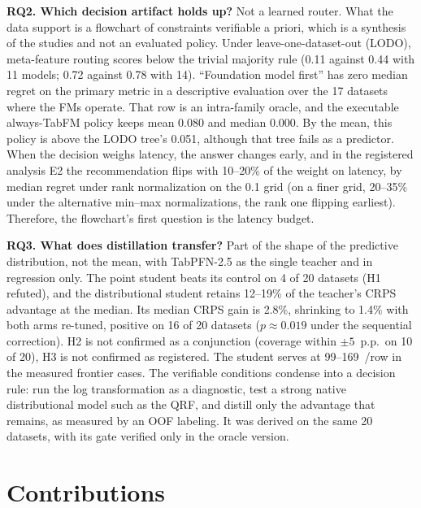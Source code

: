 \textbf{RQ2. Which decision artifact holds up?} Not a learned router. What the data support is a flowchart of constraints verifiable a priori, which is a synthesis of the studies and not an evaluated policy. Under
leave-one-dataset-out (LODO), meta-feature routing scores below the
trivial majority rule (0.11 against 0.44 with 11 models; 0.72 against
0.78 with 14). ``Foundation model first'' has zero median regret on
the primary metric in a descriptive evaluation over the 17 datasets
where the FMs operate. That row is an intra-family oracle,
and the executable always-TabFM policy keeps mean 0.080 and
median 0.000. By the mean, this policy is above the LODO tree's 0.051,
although that tree fails as a predictor. When the decision weighs
latency, the answer changes early, and in the registered analysis E2
the recommendation flips with 10--20\% of the weight on latency, by median regret under rank normalization on the 0.1 grid (on a finer grid, 20--35\% under the alternative min--max normalizations, the rank one flipping earliest).
Therefore, the flowchart's first question is the
latency budget.

\textbf{RQ3. What does distillation transfer?} Part of the
shape of the predictive distribution, not the mean, with TabPFN-2.5
as the single teacher and in regression only. The point student beats its control on 4 of 20 datasets (H1
refuted), and the distributional student retains 12--19\% of the
teacher's CRPS advantage at the median. Its median CRPS gain is
2.8\%, shrinking to 1.4\% with both arms re-tuned, positive on 16 of
20 datasets ($p\approx0.019$ under the sequential correction). H2 is not confirmed as a conjunction (coverage within
$\pm5$~p.p.\ on 10 of 20), H3 is not confirmed as registered. The student serves at 99--169~\us/row in the measured frontier cases. The
verifiable conditions condense into a decision rule: run the log
transformation as a diagnostic, test a strong native distributional model such as the QRF,
and distill only the advantage that remains, as measured by an OOF
labeling. It was derived on the same 20 datasets, with its gate
verified only in the oracle version.

\section{Contributions}
\label{sec:conc-contribuicoes}

